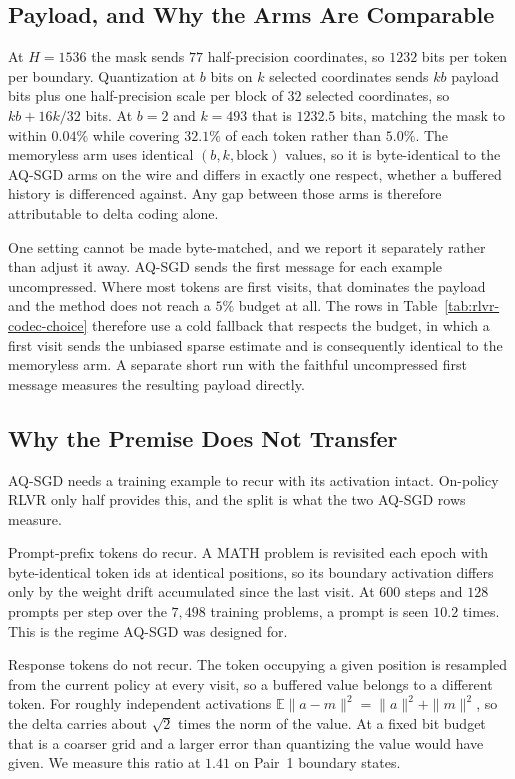 \begin{revised}
\subsection{Payload, and Why the Arms Are Comparable}

At $H=1536$ the mask sends $77$ half-precision coordinates, so $1232$ bits per
token per boundary. Quantization at $b$ bits on $k$ selected coordinates sends
$kb$ payload bits plus one half-precision scale per block of $32$ selected
coordinates, so $kb + 16k/32$ bits. At $b=2$ and $k=493$ that is $1232.5$ bits,
matching the mask to within $0.04\%$ while covering $32.1\%$ of each token
rather than $5.0\%$. The memoryless arm uses identical $(b,k,\text{block})$
values, so it is byte-identical to the AQ-SGD arms on the wire and differs in
exactly one respect, whether a buffered history is differenced against. Any gap
between those arms is therefore attributable to delta coding alone.

One setting cannot be made byte-matched, and we report it separately rather
than adjust it away. AQ-SGD sends the first message for each example
uncompressed. Where most tokens are first visits, that dominates the payload
and the method does not reach a $5\%$ budget at all. The rows in
Table~\ref{tab:rlvr-codec-choice} therefore use a cold fallback that respects
the budget, in which a first visit sends the unbiased sparse estimate and is
consequently identical to the memoryless arm. A separate short run with the
faithful uncompressed first message measures the resulting payload directly.

\subsection{Why the Premise Does Not Transfer}

AQ-SGD needs a training example to recur with its activation intact. On-policy
RLVR only half provides this, and the split is what the two AQ-SGD rows
measure.

Prompt-prefix tokens do recur. A MATH problem is revisited each epoch with
byte-identical token ids at identical positions, so its boundary activation
differs only by the weight drift accumulated since the last visit. At $600$
steps and $128$ prompts per step over the $7{,}498$ training problems, a prompt
is seen $10.2$ times. This is the regime AQ-SGD was designed for.

Response tokens do not recur. The token occupying a given position is resampled
from the current policy at every visit, so a buffered value belongs to a
different token. For roughly independent activations
$\mathbb E\|a-m\|^2=\|a\|^2+\|m\|^2$, so the delta carries about $\sqrt2$ times
the norm of the value. At a fixed bit budget that is a coarser grid and a
larger error than quantizing the value would have given. We measure this ratio
at $1.41$ on Pair~1 boundary states.


\end{revised}
